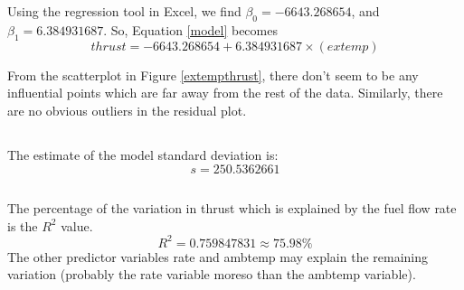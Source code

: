 \documentclass[letterpaper]{article}
\begin{document}

\section{}

\subsection{}

Using the regression tool in Excel, we find $\beta_0=-6643.268654$, and
$\beta_1=6.384931687$.
So, Equation \ref{model} becomes
$$ thrust = -6643.268654 + 6.384931687 \times (extemp)$$

From the scatterplot in Figure \ref{extempthrust}, there don't seem to be any
influential points which are far away from the rest of the data. Similarly, there
are no obvious outliers in the residual plot.

\subsection{}
The estimate of the model standard deviation is:
$$s = 250.5362661$$

\subsection{}

The percentage of the variation in thrust which is explained by the fuel flow rate
is the $R^2$ value.
$$R^2 = 0.759847831 \approx 75.98\%$$
The other predictor variables rate and ambtemp may explain the remaining variation
(probably the rate variable moreso than the ambtemp variable).

\subsection{}
\end{document}
